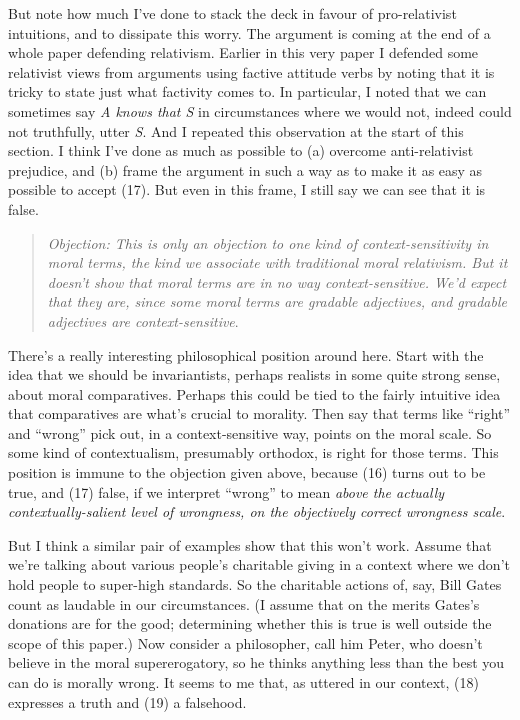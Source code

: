 \documentclass[
  10pt,
  letterpaper,
  DIV=11,
  numbers=noendperiod,
  twoside]{scrartcl}
\begin{document}
But note how much I've done to stack the deck in favour of
pro-relativist intuitions, and to dissipate this worry. The argument is
coming at the end of a whole paper defending relativism. Earlier in this
very paper I defended some relativist views from arguments using factive
attitude verbs by noting that it is tricky to state just what factivity
comes to. In particular, I noted that we can sometimes say \emph{A knows
that S} in circumstances where we would not, indeed could not
truthfully, utter \emph{S}. And I repeated this observation at the start
of this section. I think I've done as much as possible to (a) overcome
anti-relativist prejudice, and (b) frame the argument in such a way as
to make it as easy as possible to accept (17). But even in this frame, I
still say we can see that it is false.

\begin{quote}
\emph{Objection: This is only an objection to one kind of
context-sensitivity in moral terms, the kind we associate with
traditional moral relativism. But it doesn't show that moral terms are
in no way context-sensitive. We'd expect that they are, since some moral
terms are gradable adjectives, and gradable adjectives are
context-sensitive}.
\end{quote}

There's a really interesting philosophical position around here. Start
with the idea that we should be invariantists, perhaps realists in some
quite strong sense, about moral comparatives. Perhaps this could be tied
to the fairly intuitive idea that comparatives are what's crucial to
morality. Then say that terms like ``right'' and ``wrong'' pick out, in
a context-sensitive way, points on the moral scale. So some kind of
contextualism, presumably orthodox, is right for those terms. This
position is immune to the objection given above, because (16) turns out
to be true, and (17) false, if we interpret ``wrong'' to mean
\emph{above the actually contextually-salient level of wrongness, on the
objectively correct wrongness scale}.

But I think a similar pair of examples show that this won't work. Assume
that we're talking about various people's charitable giving in a context
where we don't hold people to super-high standards. So the charitable
actions of, say, Bill Gates count as laudable in our circumstances. (I
assume that on the merits Gates's donations are for the good;
determining whether this is true is well outside the scope of this
paper.) Now consider a philosopher, call him Peter, who doesn't believe
in the moral supererogatory, so he thinks anything less than the best
you can do is morally wrong. It seems to me that, as uttered in our
context, (18) expresses a truth and (19) a falsehood.
\end{document}
